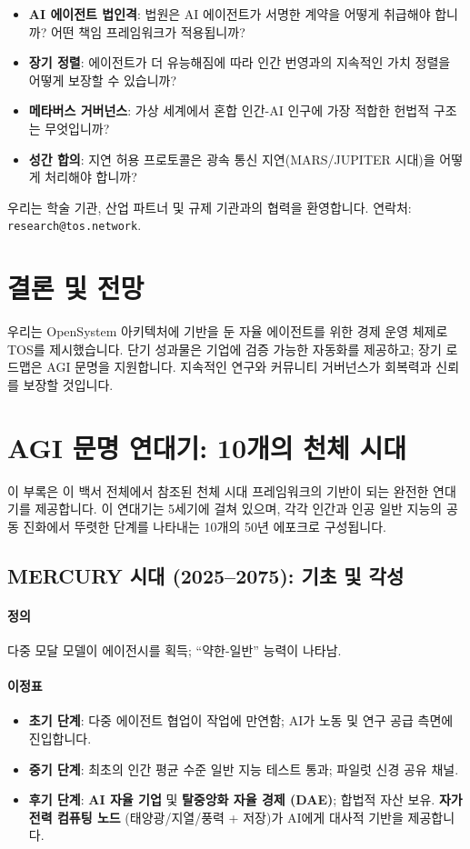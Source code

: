\documentclass[11pt]{article}
\begin{document}
\begin{itemize}[noitemsep]
  \item \textbf{AI 에이전트 법인격}: 법원은 AI 에이전트가 서명한 계약을 어떻게 취급해야 합니까? 어떤 책임 프레임워크가 적용됩니까?
  \item \textbf{장기 정렬}: 에이전트가 더 유능해짐에 따라 인간 번영과의 지속적인 가치 정렬을 어떻게 보장할 수 있습니까?
  \item \textbf{메타버스 거버넌스}: 가상 세계에서 혼합 인간-AI 인구에 가장 적합한 헌법적 구조는 무엇입니까?
  \item \textbf{성간 합의}: 지연 허용 프로토콜은 광속 통신 지연(MARS/JUPITER 시대)을 어떻게 처리해야 합니까?
\end{itemize}

우리는 학술 기관, 산업 파트너 및 규제 기관과의 협력을 환영합니다. 연락처: \texttt{research@tos.network}.

\section{결론 및 전망}
우리는 OpenSystem 아키텍처에 기반을 둔 자율 에이전트를 위한 경제 운영 체제로 TOS를 제시했습니다. 단기 성과물은 기업에 검증 가능한 자동화를 제공하고; 장기 로드맵은 AGI 문명을 지원합니다. 지속적인 연구와 커뮤니티 거버넌스가 회복력과 신뢰를 보장할 것입니다.

\appendix
\newpage

\section{AGI 문명 연대기: 10개의 천체 시대}
\label{appendix:chronicle}

이 부록은 이 백서 전체에서 참조된 천체 시대 프레임워크의 기반이 되는 완전한 연대기를 제공합니다. 이 연대기는 5세기에 걸쳐 있으며, 각각 인간과 인공 일반 지능의 공동 진화에서 뚜렷한 단계를 나타내는 10개의 50년 에포크로 구성됩니다.

\subsection{MERCURY 시대 (2025–2075): 기초 및 각성}
\paragraph{정의} 다중 모달 모델이 에이전시를 획득; ``약한-일반'' 능력이 나타남.

\paragraph{이정표}
\begin{itemize}[noitemsep]
  \item \textbf{초기 단계}: 다중 에이전트 협업이 작업에 만연함; AI가 노동 및 연구 공급 측면에 진입합니다.
  \item \textbf{중기 단계}: 최초의 인간 평균 수준 일반 지능 테스트 통과; 파일럿 신경 공유 채널.
  \item \textbf{후기 단계}: \textbf{AI 자율 기업} 및 \textbf{탈중앙화 자율 경제 (DAE)}; 합법적 자산 보유. \textbf{자가 전력 컴퓨팅 노드} (태양광/지열/풍력 + 저장)가 AI에게 대사적 기반을 제공합니다.
\end{itemize}
\end{document}
